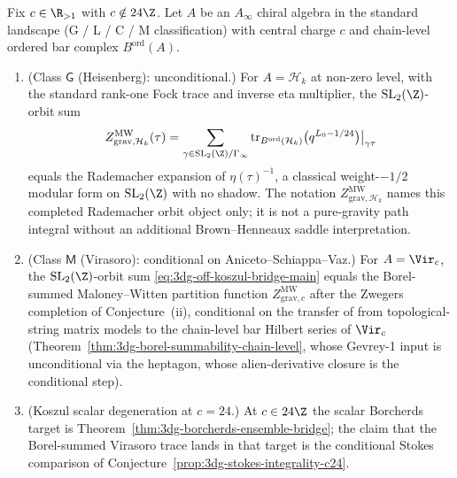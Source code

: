 \begin{conjecture}
\label{thm:3dg-off-koszul-bridge-upgraded}
%
%
%
Fix $c \in \R_{> 1}$ with $c \notin 24\Z$. Let $A$ be an
$A_{\infty}$ chiral algebra in the standard landscape
(G / L / C / M classification) with central charge $c$ and
chain-level ordered bar complex $B^{\mathrm{ord}}(A)$.
\begin{enumerate}[label=\textup{(\Alph*)}]
\item \textup{(Class $\mathsf G$ \textup{(Heisenberg)}: unconditional.)}
For \(A=\mathcal H_k\) at non-zero level, with the standard rank-one
Fock trace and inverse eta multiplier, the
$\mathrm{SL}_{2}(\Z)$-orbit sum
\begin{equation}
\label{eq:3dg-off-koszul-bridge-classG}
Z^{\mathrm{MW}}_{\mathrm{grav}, \mathcal H_{k}}(\tau)
= \sum_{\gamma \in \mathrm{SL}_{2}(\Z)/\Gamma_{\infty}}
\mathrm{tr}_{B^{\mathrm{ord}}(\mathcal H_{k})}
\bigl(q^{L_{0} - 1/24}\bigr)\big|_{\gamma\tau}
\end{equation}
equals the Rademacher expansion of $\eta(\tau)^{-1}$, a
classical weight-$-1/2$ modular form on $\mathrm{SL}_{2}(\Z)$ with
no shadow. The notation \(Z^{\mathrm{MW}}_{\mathrm{grav},
\mathcal H_k}\) names this completed Rademacher orbit object only; it
is not a pure-gravity path integral without an additional
Brown--Henneaux saddle interpretation.
\item \textup{(Class $\mathsf M$ \textup{(Virasoro)}: conditional on
Aniceto--Schiappa--Vaz.)} For $A = \Vir_{c}$, the
$\mathrm{SL}_{2}(\Z)$-orbit sum
\eqref{eq:3dg-off-koszul-bridge-main} equals the Borel-summed
Maloney--Witten partition function
$Z^{\mathrm{MW}}_{\mathrm{grav}, c}$ after the Zwegers completion of
Conjecture~\textup{(ii)}, conditional on the transfer of
\cite[Thm.~3.1]{AnicetoSchiappa2015} from topological-string matrix
models to the chain-level bar Hilbert series of $\Vir_{c}$
\textup{(Theorem~\ref{thm:3dg-borel-summability-chain-level}, whose
Gevrey-1 input is unconditional via the heptagon, whose
alien-derivative closure is the conditional step)}.
\item \textup{(Koszul scalar degeneration at \(c=24\).)} At
\(c\in24\Z\) the scalar Borcherds target is
Theorem~\ref{thm:3dg-borcherds-ensemble-bridge}; the claim that the
Borel-summed Virasoro trace lands in that target is the conditional
Stokes comparison of Conjecture~\ref{prop:3dg-stokes-integrality-c24}.
\end{enumerate}
\end{conjecture}


